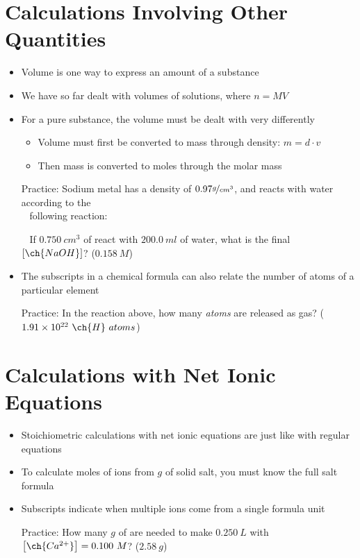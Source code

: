 \documentclass[12pt, openany, letterpaper]{memoir}
\begin{document}
\section{Calculations Involving Other Quantities}
\begin{itemize}
	\item Volume is one way to express an amount of a substance
	\item We have so far dealt with volumes of solutions, where $n=MV$
	\item For a pure substance, the volume must be dealt with very differently
	\begin{itemize}
		\item Volume must first be converted to mass through density: $m=d\cdot v$
		\item Then mass is converted to moles through the molar mass
	\end{itemize}

	Practice: Sodium metal has a density of $0.97\nicefrac{g}{cm^3}$, and reacts with water according to the\\
	~\hphantom{Practice: } following reaction: 
	
	~\hphantom{Practice:} If $0.750~cm^3$ of  react with $200.0~ml$ of water, what is the final $\left[\ch{NaOH}\right]$? \hspace{1em} ($0.158~M$)
	\item The subscripts in a chemical formula can also relate the number of atoms of a particular element
	
	Practice: In the reaction above, how many  \emph{atoms} are released as gas? \hspace{1em} ($1.91\times10^{22}~\ch{H}~atoms$)
\end{itemize}
\section{Calculations with Net Ionic Equations}
\begin{itemize}
	\item Stoichiometric calculations with net ionic equations are just like with regular equations
	\item To calculate moles of ions from $g$ of solid salt, you must know the full salt formula
	\item Subscripts indicate when multiple ions come from a single formula unit
	
	Practice: How many $g$ of  are needed to make $0.250~L$ with $\left[\ch{Ca^{2+}}\right]=0.100~M$? \hspace{1em} ($2.58~g$)
\end{itemize}
\end{document}
